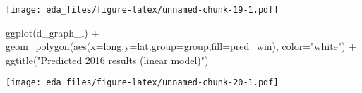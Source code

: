 \documentclass[
]{article}
\newenvironment{Shaded}{\begin{snugshade}}{\end{snugshade}}
\newcommand{\AttributeTok}[1]{\textcolor[rgb]{0.77,0.63,0.00}{#1}}
\newcommand{\FunctionTok}[1]{\textcolor[rgb]{0.00,0.00,0.00}{#1}}
\newcommand{\NormalTok}[1]{#1}
\newcommand{\SpecialCharTok}[1]{\textcolor[rgb]{0.00,0.00,0.00}{#1}}
\newcommand{\StringTok}[1]{\textcolor[rgb]{0.31,0.60,0.02}{#1}}
\begin{document}
\texttt{[image: eda\_files/figure-latex/unnamed-chunk-19-1.pdf]}

\begin{Shaded}
\begin{Highlighting}[]
\FunctionTok{ggplot}\NormalTok{(d\_graph\_l) }\SpecialCharTok{+}
    \FunctionTok{geom\_polygon}\NormalTok{(}\FunctionTok{aes}\NormalTok{(}\AttributeTok{x=}\NormalTok{long,}\AttributeTok{y=}\NormalTok{lat,}\AttributeTok{group=}\NormalTok{group,}\AttributeTok{fill=}\NormalTok{pred\_win),}
                 \AttributeTok{color=}\StringTok{"white"}\NormalTok{) }\SpecialCharTok{+}
    \FunctionTok{ggtitle}\NormalTok{(}\StringTok{"Predicted 2016 results (linear model)"}\NormalTok{)}
\end{Highlighting}
\end{Shaded}

\texttt{[image: eda\_files/figure-latex/unnamed-chunk-20-1.pdf]}
\end{document}
